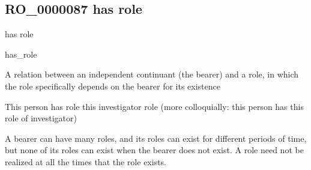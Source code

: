 \documentclass[letterpaper,10pt,english]{sphinxmanual}
\begin{document}
\subsection{RO\_0000087 \sphinxhyphen{} has role}
\label{\detokenize{doc-RO_0000087:ro-0000087-has-role}}\label{\detokenize{doc-RO_0000087:index-0}}\label{\detokenize{doc-RO_0000087::doc}}
\begin{sphinxShadowBox}

\sphinxAtStartPar
has role
\end{sphinxShadowBox}

\begin{sphinxShadowBox}

\sphinxAtStartPar
has\_role
\end{sphinxShadowBox}

\begin{sphinxShadowBox}

\sphinxAtStartPar
{\hyperref[\detokenize{doc-RO_0000053::doc}]{}}
\end{sphinxShadowBox}

\begin{sphinxShadowBox}

\sphinxAtStartPar
A relation between an independent continuant (the bearer) and a role, in which the role specifically depends on the bearer for its existence
\end{sphinxShadowBox}

\begin{sphinxShadowBox}

\sphinxAtStartPar
This person has role this investigator role (more colloquially: this person has this role of investigator)
\end{sphinxShadowBox}

\begin{sphinxShadowBox}

\sphinxAtStartPar
A bearer can have many roles, and its roles can exist for different periods of time, but none of its roles can exist when the bearer does not exist. A role need not be realized at all the times that the role exists.
\end{sphinxShadowBox}

\begin{sphinxShadowBox}

\sphinxAtStartPar
{}
\end{sphinxShadowBox}
\begin{quote}

\ignorespaces \end{quote}
\end{document}

